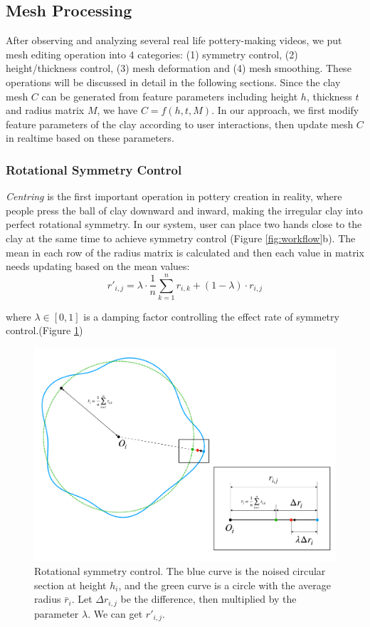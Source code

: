 \documentclass{svjour3}                     %
\begin{document}
\subsection{Mesh Processing}
\label{sec:4.2}
After observing and analyzing several real life pottery-making videos, we put mesh editing operation into 4 categories: (1) symmetry control, (2) height/thickness control, (3) mesh deformation and (4) mesh smoothing. These operations will be discussed in detail in the following sections.
Since the clay mesh $C$ can be generated from feature parameters including height $h$, thickness $t$ and radius matrix $M$, we have $ C =  f(h, t, M) $.
In our approach, we first modify feature parameters of the clay according to user interactions, then update mesh $C$  in realtime based on these parameters.

\subsubsection{Rotational Symmetry Control}
\label{sec:4.2.1}
\textit{Centring} is the first important operation in pottery creation in reality, where people press the ball of clay downward and inward, making the irregular clay into perfect rotational symmetry.
In our system, user can place two hands close to the clay at the same time to achieve symmetry control (Figure \ref{fig:workflow}b).
The mean in each row of the radius matrix is calculated and then each value in matrix needs updating based on the mean values:
\begin{equation}
r'_{i,j} = 
\lambda \cdot \frac{1}{n}\sum_{k=1}^{n} r_{i,k}
+ (1 - \lambda) \cdot r_{i,j}
\end{equation}

where $\lambda \in [0,1]$ is a damping factor controlling the effect rate of symmetry control.(Figure \ref{fig:symmetry})

\begin{figure}
\includegraphics[width=\textwidth]{fig5.pdf}
\caption{Rotational symmetry control. The blue curve is the noised circular section at height $h_{i}$, and the green curve is a circle with the average radius $\bar r_{i}$. Let $\Delta r_{i,j}$ be the difference, then multiplied by the parameter $\lambda$. We can get $r'_{i, j}$.}
\label{fig:symmetry}
\end{figure}
\end{document}
